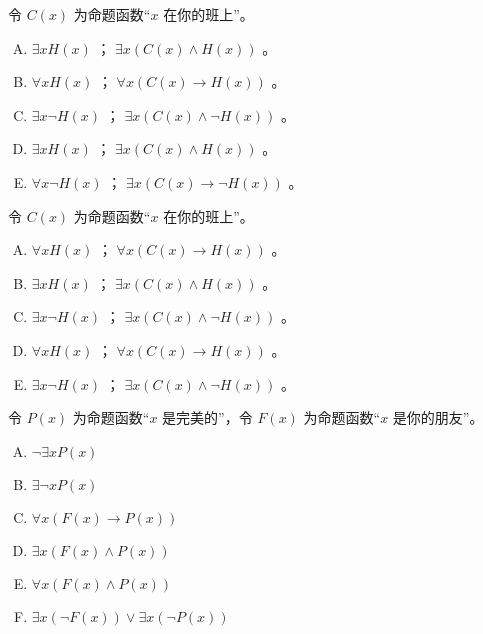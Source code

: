 {{        %
        \begin{practices}
            令 $C(x)$ 为命题函数``$x$ 在你的班上''。
            \begin{enumerate}[A.]
                \item $\exists x H(x)$ ； $\exists x (C(x) \wedge H(x))$ 。
                \item $\forall x H(x)$ ； $\forall x (C(x) \rightarrow H(x))$ 。
                \item $\exists x \neg H(x)$ ； $\exists x (C(x) \wedge \neg H(x))$ 。
                \item $\exists x H(x)$ ； $\exists x (C(x) \wedge H(x))$ 。
                \item $\forall x \neg H(x)$ ； $\exists x (C(x) \rightarrow \neg H(x))$ 。
            \end{enumerate}
        \end{practices}

        \begin{practices}
            令 $C(x)$ 为命题函数``$x$ 在你的班上''。
            \begin{enumerate}[A.]
                \item $\forall x H(x)$ ； $\forall x (C(x) \rightarrow H(x))$ 。
                \item $\exists x H(x)$ ； $\exists x (C(x) \wedge H(x))$ 。
                \item $\exists x \neg H(x)$ ； $\exists x (C(x) \wedge \neg H(x))$ 。
                \item $\forall x H(x)$ ； $\forall x (C(x) \rightarrow H(x))$ 。
                \item $\exists x \neg H(x)$ ； $\exists x (C(x) \wedge \neg H(x))$ 。
            \end{enumerate}
        \end{practices}

        \begin{practices}
            令 $P(x)$ 为命题函数``$x$ 是完美的''，令 $F(x)$ 为命题函数``$x$ 是你的朋友''。
            \begin{enumerate}[A.]
                \item $\neg \exists x P(x)$
                \item $\exists \neg x P(x)$
                \item $\forall x (F(x) \rightarrow P(x))$
                \item $\exists x (F(x) \wedge P(x))$
                \item $\forall x (F(x) \wedge P(x))$
                \item $\exists x (\neg F(x)) \vee \exists x (\neg P(x))$
            \end{enumerate}
        \end{practices}

}}
